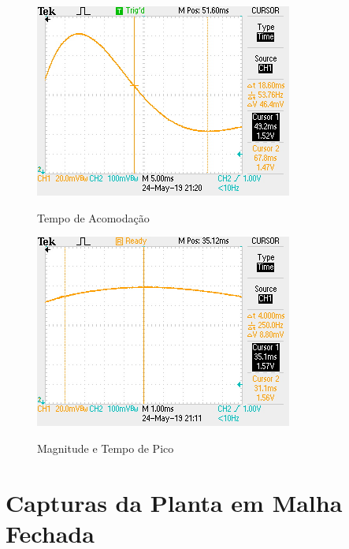 \documentclass[
	12pt,				%
	article,			%
	openright,			%
	oneside,
	a4paper,			%
	chapter=TITLE,		%
	section=TITLE,		%
	english,			%
	french,				%
	spanish,			%
	brazil,				%
]{abntex2}
\begin{document}
\begin{apendicesenv}
        	\begin{figure}[htbp]
            	\centering
            	\caption{Tempo de Acomodação}
            	\includegraphics[width=\textwidth,height=240px,keepaspectratio]{imgs/ftma/settling_time.JPG}
            	\label{fig-ftma-settling_time}
        	\end{figure}
        
        	\begin{figure}[htbp]
            	\centering
            	\caption{Magnitude e Tempo de Pico}
            	\includegraphics[width=\textwidth,height=240px,keepaspectratio]{imgs/ftma/overshoot.JPG}
            	\label{fig-ftma-overshoot}
        	\end{figure}
        	\FloatBarrier
        	
        	\clearpage
        	
        \chapter{Capturas da Planta em Malha Fechada}
        	\label{ap-ftmf}
        	

\end{apendicesenv}
\end{document}
